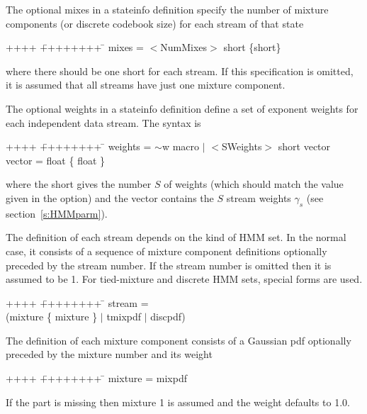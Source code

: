 The optional {\sf mixes} in a {\sf stateinfo} definition specify
the number of mixture components (or discrete codebook size) for 
each stream of that state
{\sf
\begin{tabbing}
++++ \= ++++++++ \=  \kill
\>   mixes = \>  $<$NumMixes$>$ short \{short\}
\end{tabbing}
}
\noindent
where there should be one {\sf short} for each stream.  If this
specification is omitted, it is assumed that all streams
have just one mixture component.

The optional {\sf weights} in a {\sf stateinfo} definition define
a set of exponent weights for each independent data stream.  The
syntax is
{\sf
\begin{tabbing}
++++ \= ++++++++ \=  \kill
\>   weights = \> $\sim$w macro $|$ $<$SWeights$>$ short vector \\
\>   vector  = \> float \{ float \} 
\end{tabbing}
}
\noindent
where the {\sf short} gives the number $S$ of weights (which should match the
value given in the  option) and the {\sf vector}
contains the $S$ stream weights $\gamma_s$ (see section~\ref{s:HMMparm}).

The definition of each  {\sf stream} 
depends on the kind of HMM set.  In the normal case, it
consists of a sequence of mixture
component
definitions optionally preceded by the stream number.  If the stream
number is omitted then it is assumed to be 1.  For tied-mixture
and discrete HMM sets, special forms are used.
{\sf
\begin{tabbing}
++++ \= ++++++++ \=  \kill
\>   stream =  \\
\>            \> (mixture \{ mixture \} $|$ tmixpdf $|$ discpdf)
\end{tabbing}
}

The definition of each mixture component consists of a Gaussian
pdf optionally preceded by the mixture number and its weight
{\sf
\begin{tabbing}
++++ \= ++++++++ \=  \kill
\>   mixture =  mixpdf
\end{tabbing}
}
\noindent
If the  part is missing then mixture 1 is assumed and the
weight defaults to 1.0. 

